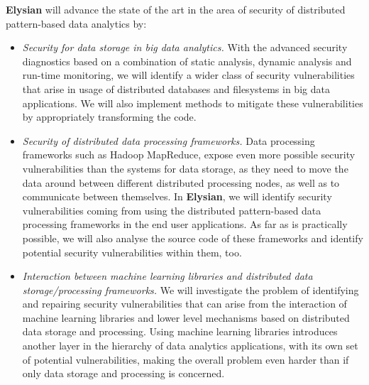 \documentclass[a4paper,11pt]{article}
\newcommand{\project}[1]{\textbf{#1}\xspace}
\newcommand{\SECURITY}{\project{Elysian}}
\newcommand{\TheProject}{\SECURITY}
\begin{document}
\begin{mdframed}[backgroundcolor=gray!10]
\TheProject{} will advance the state of the art in the area of 
security of distributed pattern-based data analytics by:
\begin{itemize}
\item \emph{Security for data storage in big data analytics.} With the advanced security diagnostics based on a combination of static analysis, dynamic analysis and run-time monitoring, we will identify a wider class of security vulnerabilities that arise in usage of distributed databases and filesystems in big data applications. We will also implement methods to mitigate these vulnerabilities by appropriately transforming the code.
\item \emph{Security of distributed data processing frameworks.} Data processing frameworks such as Hadoop MapReduce, expose even more possible security vulnerabilities than the systems for data storage, as they need to move the data around between different distributed processing nodes, as well as to communicate between themselves. In \TheProject{}, we will identify security vulnerabilities coming from using the distributed pattern-based data processing frameworks in the end user applications. As far as is practically possible, we will also analyse the source code of these frameworks and identify potential security vulnerabilities within them, too.
\item \emph{Interaction between machine learning libraries and distributed data storage/processing frameworks.} We will investigate the problem of identifying and repairing security vulnerabilities that can arise from the interaction of machine learning libraries and lower level mechanisms based on distributed data storage and processing. Using machine learning libraries introduces another layer in the hierarchy of data analytics applications, with its own set of potential vulnerabilities, making the overall problem even harder than if only data storage and processing is concerned. 
\end{itemize}
\end{mdframed}
\end{document}
